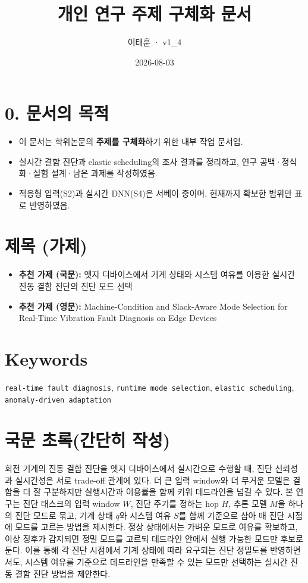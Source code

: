 \documentclass[10pt]{article}
\title{개인 연구 주제 구체화 문서}
\author{이태훈 · v1\_4}
\date{2026-08-03}
\begin{document}
\maketitle

\section*{0. 문서의 목적}
\begin{itemize}
\item 이 문서는 학위논문의 \textbf{주제를 구체화}하기 위한 내부 작업 문서임.
\item 실시간 결함 진단과 elastic scheduling의 조사 결과를 정리하고, 연구 공백·정식화·실험 설계·남은 과제를 작성하였음.
\item 적응형 입력(S2)과 실시간 DNN(S4)은 서베이 중이며, 현재까지 확보한 범위만 표로 반영하였음.
\end{itemize}

\section{제목 (가제)}
\begin{itemize}
\item \textbf{추천 가제 (국문):} 엣지 디바이스에서 기계 상태와 시스템 여유를 이용한 실시간 진동 결함 진단의 진단 모드 선택
\item \textbf{추천 가제 (영문):} Machine-Condition and Slack-Aware Mode Selection for Real-Time Vibration Fault Diagnosis on Edge Devices
\end{itemize}

\section{Keywords}
\texttt{real-time fault diagnosis}, \texttt{runtime mode selection}, \texttt{elastic scheduling}, \texttt{anomaly-driven adaptation}

\section{국문 초록(간단히 작성)}
회전 기계의 진동 결함 진단을 엣지 디바이스에서 실시간으로 수행할 때, 진단 신뢰성과 실시간성은 서로 trade-off 관계에 있다. 더 큰 입력 window와 더 무거운 모델은 결함을 더 잘 구분하지만 실행시간과 이용률을 함께 키워 데드라인을 넘길 수 있다. 본 연구는 진단 태스크의 입력 window $W$, 진단 주기를 정하는 hop $H$, 추론 모델 $M$을 하나의 진단 모드로 묶고, 기계 상태 $q$와 시스템 여유 $S$를 함께 기준으로 삼아 매 진단 시점에 모드를 고르는 방법을 제시한다. 정상 상태에서는 가벼운 모드로 여유를 확보하고, 이상 징후가 감지되면 정밀 모드를 고르되 데드라인 안에서 실행 가능한 모드만 후보로 둔다. 이를 통해 각 진단 시점에서 기계 상태에 따라 요구되는 진단 정밀도를 반영하면서도, 시스템 여유를 기준으로 데드라인을 만족할 수 있는 모드만 선택하는 실시간 진동 결함 진단 방법을 제안한다.
\end{document}
